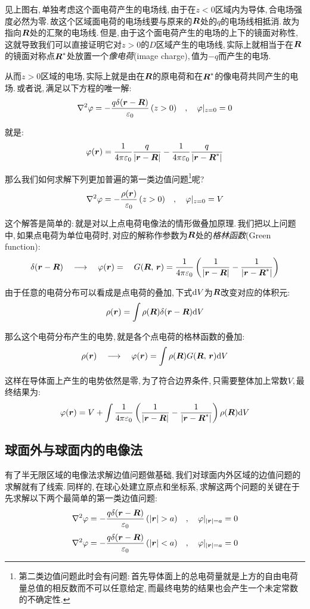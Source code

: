 见上图右,\,单独考虑这个面电荷产生的电场线,\,由于在$z<0$区域内为导体,\,合电场强度必然为零.\,故这个区域面电荷的电场线要与原来的$\boldsymbol{R}$处的$q$的电场线相抵消.\,故为指向$\boldsymbol{R}$处的汇聚的电场线.\,但是,\,由于这个面电荷产生的电场的上下的镜面对称性,\,这就导致我们可以直接证明它对$z>0$的$D$区域产生的电场线,\,实际上就相当于在$\boldsymbol{R}$的镜面对称点$\boldsymbol{R}^\ast$处放置一个\emph{像电荷}(image charge),\,值为$-q$而产生的电场.

从而$z>0$区域的电场,\,实际上就是由在$\boldsymbol{R}$的原电荷和在$\boldsymbol{R}^\ast$的像电荷共同产生的电场.\,或者说,\,满足以下方程的唯一解:
\[\nabla^2\varphi =-\frac{q\delta(\boldsymbol{r}-\boldsymbol{R})}{\varepsilon_0}\,(z>0)\quad ,\quad \varphi|_{z=0}=0\]

就是:
\[\varphi(\boldsymbol{r}) =\frac{1}{4\pi\varepsilon_0} \frac{q}{|\boldsymbol{r}-\boldsymbol{R}|}-\frac{1}{4\pi\varepsilon_0} \frac{q}{|\boldsymbol{r}-\boldsymbol{R}^\ast|}\]

那么我们如何求解下列更加普遍的第一类边值问题\footnote{第二类边值问题此时会有问题:\,首先导体面上的总电荷量就是上方的自由电荷量总值的相反数而不可以任意给定,\,而最终电势的结果也会产生一个未定常数的不确定性.}呢?
\[\nabla^2\varphi = -\frac{\rho(\boldsymbol{r})}{\varepsilon_0}\,(z>0)\quad ,\quad \varphi|_{z=0}=V\]

这个解答是简单的:\,就是对以上点电荷电像法的情形做叠加原理.\,我们把以上问题中,\,如果点电荷为单位电荷时,\,对应的解称作参数为$\boldsymbol{R}$处的\emph{格林函数}(Green function):
\[\delta(\boldsymbol{r}-\boldsymbol{R})\quad \longrightarrow\quad  \varphi(\boldsymbol{r})=\quad G(\boldsymbol{R},\,\boldsymbol{r})=\frac{1}{4\pi\varepsilon_0} \left(\frac{1}{|\boldsymbol{r}-\boldsymbol{R}|}-\frac{1}{|\boldsymbol{r}-\boldsymbol{R}^\ast|}\right)\]

由于任意的电荷分布可以看成是点电荷的叠加,\,下式$\textrm{d} V$为$\boldsymbol{R}$改变对应的体积元:
\[\rho(\boldsymbol{r})=\int \rho(\boldsymbol{R})\delta(\boldsymbol{r}-\boldsymbol{R})\textrm{d} V\]

那么这个电荷分布产生的电势,\,就是各个点电荷的格林函数的叠加:
\[\rho(\boldsymbol{r})\quad \longrightarrow \quad \varphi(\boldsymbol{r})=\int  \rho(\boldsymbol{R})G(\boldsymbol{R},\,\boldsymbol{r})\textrm{d} V\]

这样在导体面上产生的电势依然是零,\,为了符合边界条件,\,只需要整体加上常数$V$,\,最终结果为:
\[\varphi(\boldsymbol{r})=V+\int \frac{1}{4\pi\varepsilon_0} \left(\frac{1}{|\boldsymbol{r}-\boldsymbol{R}|}-\frac{1}{|\boldsymbol{r}-\boldsymbol{R}^\ast|}\right)\rho(\boldsymbol{R})\textrm{d} V\]

\subsection{球面外与球面内的电像法}

有了半无限区域的电像法求解边值问题做基础,\,我们对球面内外区域的边值问题的求解就有了线索.\,同样的,\,在球心处建立原点和坐标系,\,求解这两个问题的关键在于先求解以下两个最简单的第一类边值问题:
\[\nabla^2\varphi =-\frac{q\delta(\bs{r}-\bs{R})}{\varepsilon_0}\,(|\bs{r}|>a)\quad ,\quad \varphi|_{|\bs{r}|=a}=0\]
\[\nabla^2\varphi =-\frac{q\delta(\boldsymbol{r}-\boldsymbol{R})}{\varepsilon_0}\,(|\boldsymbol{r}|<a)\quad ,\quad \varphi|_{|\boldsymbol{r}|=a}=0\]

